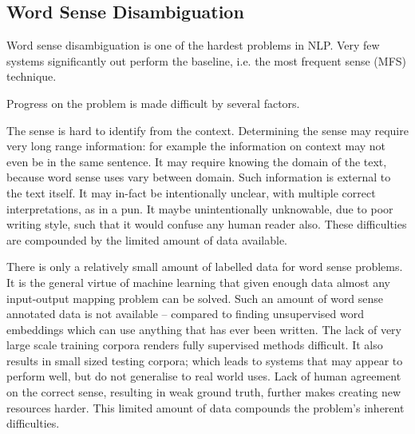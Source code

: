 \documentclass[12pt,parskip]{komatufte}
\begin{document}
\begin{figure}
{}
	
	
\end{figure}



\subsection{Word Sense Disambiguation}
Word sense disambiguation is one of the hardest problems in NLP.
Very few systems significantly out perform the baseline, i.e. the most frequent sense (MFS) technique.

Progress on the problem is made difficult by several factors.

The sense is hard to identify from the context.
Determining the sense may require very long range information:
for example the information on context may not even be in the same sentence.
It may require knowing the domain of the text, because word sense uses vary between domain.
Such information is external to the text itself.
It may in-fact be intentionally unclear, with multiple correct interpretations, as in a pun.
It maybe unintentionally unknowable, due to poor writing style, such that it would confuse any human reader also.
These difficulties are compounded by the limited amount of data available.

There is only a relatively small amount of labelled data for word sense problems.
It is the general virtue of machine learning that given enough data almost any input-output mapping problem can be solved.
Such an amount of word sense annotated data is not available -- compared to finding unsupervised word embeddings which can use anything that has ever been written.
The lack of very large scale training corpora renders fully supervised methods difficult.
It also results in small sized testing corpora; which leads to systems that may appear to perform well, but do not generalise to real world uses.
Lack of human agreement on the correct sense, resulting in weak ground truth, further makes creating new resources harder.
This limited amount of data compounds the problem's inherent difficulties.
\end{document}
